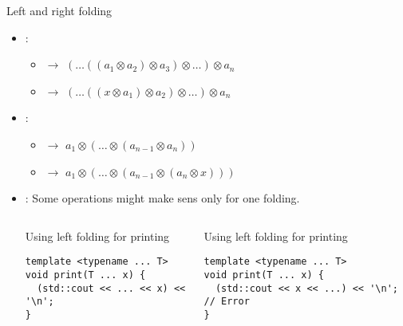 \begin{frame}[t,fragile]{Left and right folding}
\begin{itemize}
  \item {}:
    \begin{itemize}
      \item {} \quad $\rightarrow$ \quad 
            $(\ldots((a_1 \otimes a_2) \otimes a_3) \otimes \ldots) \otimes a_n$
      \item {} \quad $\rightarrow$ \quad
            $(\ldots((x \otimes a_1) \otimes a_2) \otimes \ldots) \otimes a_n$
    \end{itemize}
  \item {}:
    \begin{itemize}
      \item {} \quad $\rightarrow$ \quad
            $a_1 \otimes (\ldots \otimes (a_{n-1} \otimes a_n))$ 
      \item {} \quad $\rightarrow$ \quad
            $a_1 \otimes (\ldots \otimes (a_{n-1} \otimes (a_n \otimes x)))$ 
    \end{itemize}

  \item {}: Some operations might make sens only for one folding.

\begin{columns}[T]

\begin{block}{Using left folding for printing}
\begin{lstlisting}
template <typename ... T>
void print(T ... x) {
  (std::cout << ... << x) << '\n';
}
\end{lstlisting}
\end{block}

\pause
{}
\begin{block}{Using left folding for printing}
\begin{lstlisting}
template <typename ... T>
void print(T ... x) {
  (std::cout << x << ...) << '\n'; // Error
}
\end{lstlisting}
\end{block}

\end{columns}
\end{itemize}
\end{frame}

